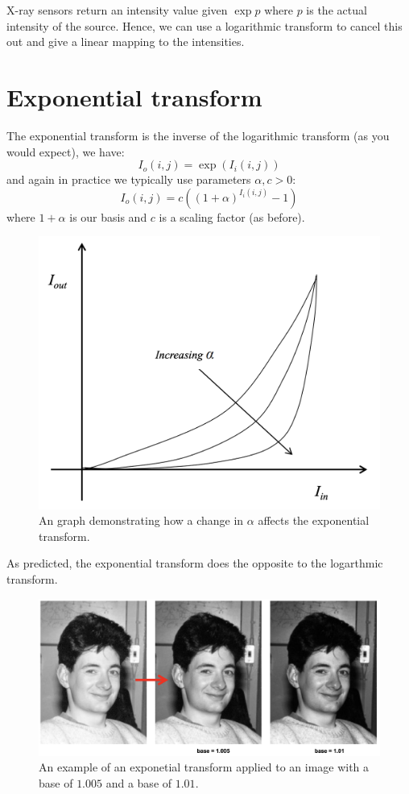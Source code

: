 \begin{example}
    X-ray sensors return an intensity value given 
    $\exp{p}$ 
    where $p$ is the actual intensity of the source.
    Hence, we can use a logarithmic transform to cancel this out
    and give a linear mapping to the intensities.
\end{example}

\section{Exponential transform}

The exponential transform is the inverse of the logarithmic transform (as you would expect), we have:
\[ I_o(i, j) = \exp(I_i(i, j)) \]
and again in practice we typically use parameters $\alpha, c > 0$:
\[ I_o(i, j) = c ((1 + \alpha)^{I_i(i, j)} - 1) \]
where 
$1 + \alpha$ 
is our basis and $c$ is a scaling factor (as before).

\begin{figure}
    \centering
    \includegraphics[width=0.5\linewidth]{images/exp-scaling-factor.png}
    \caption{An graph demonstrating how a change in $\alpha$ affects the exponential transform.}
    \label{fig:exp-scaling-factor}
\end{figure}

As predicted, the exponential transform does the opposite to the logarthmic transform.

\begin{figure}
    \centering
    \includegraphics[width=0.8\linewidth]{images/exp-transform.png}
    \caption{An example of an exponetial transform applied to an image with a base of $1.005$ and a base of $1.01$.}
    \label{fig:exp-transform}
\end{figure}

